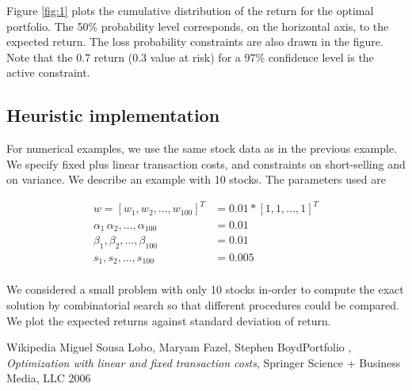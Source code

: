 \documentclass[a4paper]{article}
\begin{document}
Figure \ref{fig:1} plots the cumulative distribution of the return for the optimal portfolio. The
50\% probability level corresponds, on the horizontal axis, to the expected return. The loss
probability constraints are also drawn in the figure. Note that the 0.7 return (0.3 value at risk)
for a 97\% confidence level is the active constraint.


\subsection{Heuristic implementation}

For numerical examples, we use the same stock data as in the previous example. We specify fixed plus linear transaction costs, and constraints on short-selling and on variance. We
describe an example with 10 stocks. The parameters used are

\begin{align*}
w=[w_1,w_2,\ldots,w_{100}]^T &= 0.01*[1,1,\ldots,1]^T\\
\alpha_1\,\alpha_2,\ldots,\alpha_{100} &=0.01\\
\beta_1,\beta_2,\ldots,\beta_{100} &= 0.01\\
 s_1,s_2,\ldots,s_{100} &=0.005\\
\end{align*}

We considered a small problem with only 10 stocks in-order to compute the exact solution by combinatorial search so that different procedures could be compared. We plot the expected returns against standard deviation of return.



\begin{thebibliography}{10}

 Wikipedia
 Miguel Sousa Lobo, Maryam Fazel, Stephen BoydPortfolio , \textit{Optimization with linear and fixed transaction costs}, Springer Science + Business Media, LLC 2006
\end{thebibliography}
\end{document}
